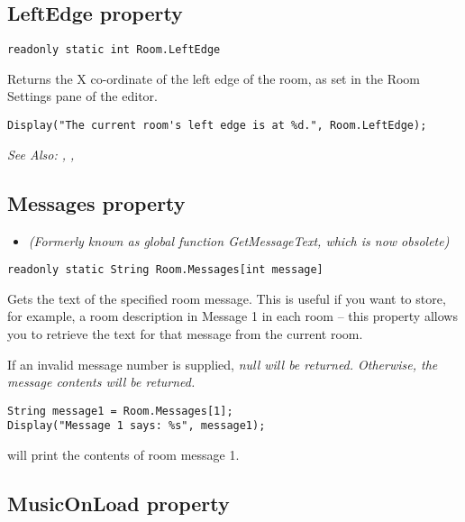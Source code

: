 \subsection{LeftEdge property}\label{Room.LeftEdge}%

\begin{verbatim}
readonly static int Room.LeftEdge
\end{verbatim}
Returns the X co-ordinate of the left edge of the room, as set in the Room Settings
pane of the editor.

\begin{verbatim}
Display("The current room's left edge is at %d.", Room.LeftEdge);
\end{verbatim}

\it{See Also:} , ,


\subsection{Messages property}\label{Room.Messages}%

\begin{itemize}
\item \it{(Formerly known as global function GetMessageText, which is now obsolete)}
\end{itemize}

\begin{verbatim}
readonly static String Room.Messages[int message]
\end{verbatim}
Gets the text of the specified room message. This is useful if you want to store,
for example, a room description in Message 1 in each room -- this property allows
you to retrieve the text for that message from the current room.

If an invalid message number is supplied, \it{null} will be returned. Otherwise, the
message contents will be returned.

\begin{verbatim}
String message1 = Room.Messages[1];
Display("Message 1 says: %s", message1);
\end{verbatim}
will print the contents of room message 1.


\subsection{MusicOnLoad property}\label{Room.MusicOnLoad}%

